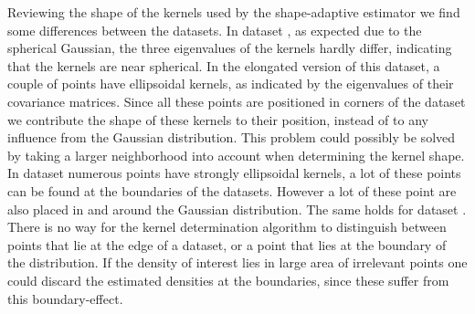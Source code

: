 		Reviewing the shape of the kernels used by the shape-adaptive estimator we find some differences between the datasets. 
			In dataset \ferdosiOne, as expected due to the spherical Gaussian, the three eigenvalues of the kernels hardly differ, indicating that the kernels are near spherical. 
			In the elongated version of this dataset, a couple of points have ellipsoidal kernels, as indicated by the eigenvalues of their covariance matrices. Since all these points are positioned in corners of the dataset we contribute the shape of these kernels to their position, instead of to any influence from the Gaussian distribution. This problem could possibly be solved by taking a larger neighborhood into account when determining the kernel shape. 
			In dataset \baakmanFour numerous points have strongly ellipsoidal kernels, a lot of these points can be found at the boundaries of the datasets. However a lot of these point are also placed in and around the Gaussian distribution. 
			The same holds for dataset \baakmanFive.
		There is no way for the kernel determination algorithm to distinguish between points that lie at the edge of a dataset, or a point that lies at the boundary of the distribution. If the density of interest lies in large area of irrelevant points one could discard the estimated densities at the boundaries, since these suffer from this boundary-effect.
			
